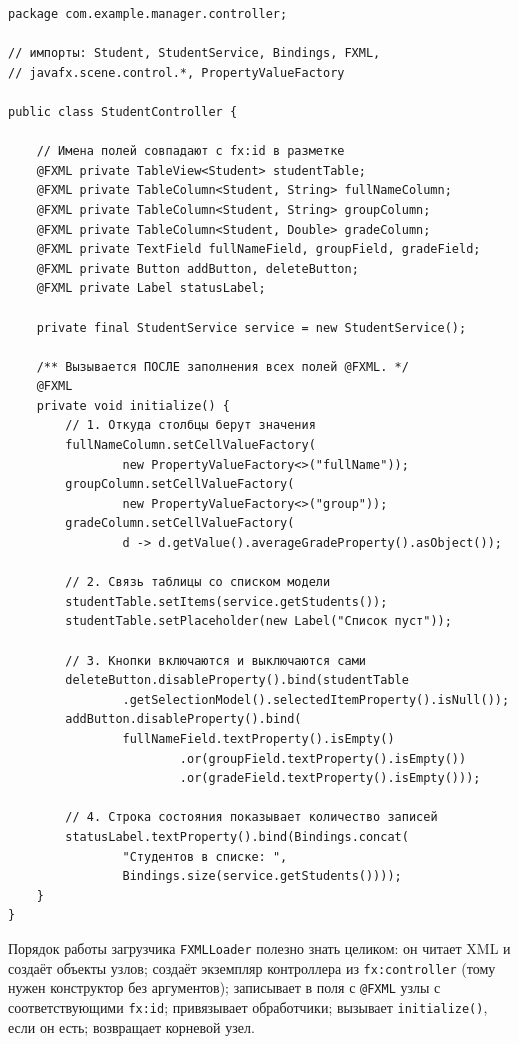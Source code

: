 \begin{listing}[H]
\begin{verbatim}
package com.example.manager.controller;

// импорты: Student, StudentService, Bindings, FXML,
// javafx.scene.control.*, PropertyValueFactory

public class StudentController {

    // Имена полей совпадают с fx:id в разметке
    @FXML private TableView<Student> studentTable;
    @FXML private TableColumn<Student, String> fullNameColumn;
    @FXML private TableColumn<Student, String> groupColumn;
    @FXML private TableColumn<Student, Double> gradeColumn;
    @FXML private TextField fullNameField, groupField, gradeField;
    @FXML private Button addButton, deleteButton;
    @FXML private Label statusLabel;

    private final StudentService service = new StudentService();

    /** Вызывается ПОСЛЕ заполнения всех полей @FXML. */
    @FXML
    private void initialize() {
        // 1. Откуда столбцы берут значения
        fullNameColumn.setCellValueFactory(
                new PropertyValueFactory<>("fullName"));
        groupColumn.setCellValueFactory(
                new PropertyValueFactory<>("group"));
        gradeColumn.setCellValueFactory(
                d -> d.getValue().averageGradeProperty().asObject());

        // 2. Связь таблицы со списком модели
        studentTable.setItems(service.getStudents());
        studentTable.setPlaceholder(new Label("Список пуст"));

        // 3. Кнопки включаются и выключаются сами
        deleteButton.disableProperty().bind(studentTable
                .getSelectionModel().selectedItemProperty().isNull());
        addButton.disableProperty().bind(
                fullNameField.textProperty().isEmpty()
                        .or(groupField.textProperty().isEmpty())
                        .or(gradeField.textProperty().isEmpty()));

        // 4. Строка состояния показывает количество записей
        statusLabel.textProperty().bind(Bindings.concat(
                "Студентов в списке: ",
                Bindings.size(service.getStudents())));
    }
}
\end{verbatim}
\caption{Контроллер: настройка в методе initialize}
\label{lst:09-15}
\end{listing}

Порядок работы загрузчика \texttt{FXMLLoader} полезно знать целиком: он читает
XML и создаёт объекты узлов; создаёт экземпляр контроллера из
\texttt{fx:controller} (тому нужен конструктор без аргументов); записывает в
поля с \texttt{@FXML} узлы с соответствующими \texttt{fx:id}; привязывает
обработчики; вызывает \texttt{initialize()}, если он есть; возвращает корневой
узел.

